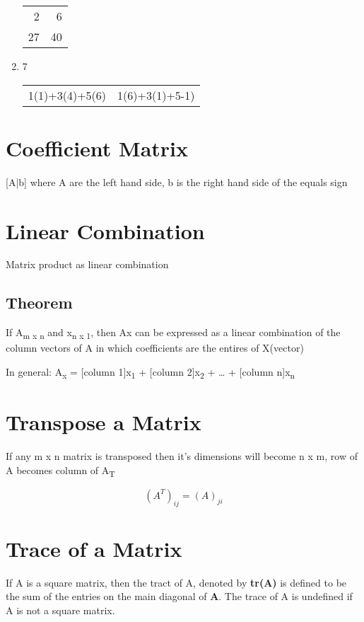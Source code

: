 \documentclass[11pt]{article}
\begin{document}
\begin{enumerate}
\begin{center}
\begin{tabular}{rr}
2 & 6\\
27 & 40\\
\end{tabular}
\end{center}
\item 7
\label{sec:org6435528}
\begin{center}
\begin{tabular}{rr}
1(1)+3(4)+5(6) & 1(6)+3(1)+5-1)\\
\end{tabular}
\end{center}
\end{enumerate}
\section{Coefficient Matrix}
\label{sec:orged86010}
{[}A|b] where A are the left hand side, b is the right hand side of the equals sign
\section{Linear Combination}
\label{sec:orgd5d5e0b}
Matrix product as linear combination
\subsection{Theorem}
\label{sec:org64499e3}
If A\textsubscript{m x n} and x\textsubscript{n x 1}, then Ax can be expressed as a linear combination of the column vectors of A in which coefficients are the entires of X(vector)

In general: A\textsubscript{x} = [column 1]x\textsubscript{1} + [column 2]x\textsubscript{2} + \ldots{} + [column n]x\textsubscript{n}
\section{Transpose a Matrix}
\label{sec:orgde0a5af}
If any m x n matrix is transposed then it's dimensions will become n x m, row of A becomes column of A\textsubscript{T}

\[(A^{T})_{ij} = (A)_{ji}\]
\section{Trace of a Matrix}
\label{sec:orgbd13c63}
If A is a square matrix, then the tract of A, denoted by \textbf{tr(A)} is defined to be the sum of the entries on the main diagonal of \textbf{A}. The trace of A is undefined if A is not a square matrix.
\end{document}
